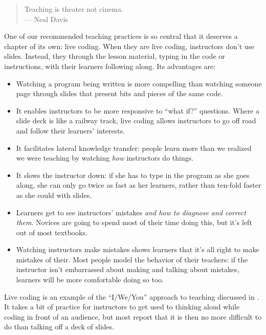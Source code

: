 
\begin{quote}
  Teaching is theater not cinema.
  \\
  --- Neal Davis
\end{quote}

One of our recommended teaching practices is so central that it
deserves a chapter of its own: live coding.  When they are live
coding, instructors don't use slides.  Instead, they through the
lesson material, typing in the code or instructions, with their
learners following along.  Its advantages are:

\begin{itemize}

\item
  Watching a program being written is more compelling than watching
  someone page through slides that present bits and pieces of the same
  code.

\item
  It enables instructors to be more responsive to ``what if?''
  questions. Where a slide deck is like a railway track, live coding
  allows instructors to go off road and follow their learners'
  interests.

\item
  It facilitates lateral knowledge transfer: people learn more than we
  realized we were teaching by watching \emph{how} instructors do
  things.

\item
  It slows the instructor down: if she has to type in the program as
  she goes along, she can only go twice as fast as her learners,
  rather than ten-fold faster as she could with slides.

\item
  Learners get to see instructors' mistakes \emph{and how to diagnose
  and correct them}. Novices are going to spend most of their time
  doing this, but it's left out of most textbooks.

\item
  Watching instructors make mistakes shows learners that it's all
  right to make mistakes of their.  Most people model the behavior of
  their teachers: if the instructor isn't embarrassed about making and
  talking about mistakes, learners will be more comfortable doing so
  too.

\end{itemize}

Live coding is an example of the ``I/We/You'' approach to teaching
discussed in .  It takes a bit of practice
for instructors to get used to thinking aloud while coding in front of
an audience, but most report that it is then no more difficult to do
than talking off a deck of slides.

